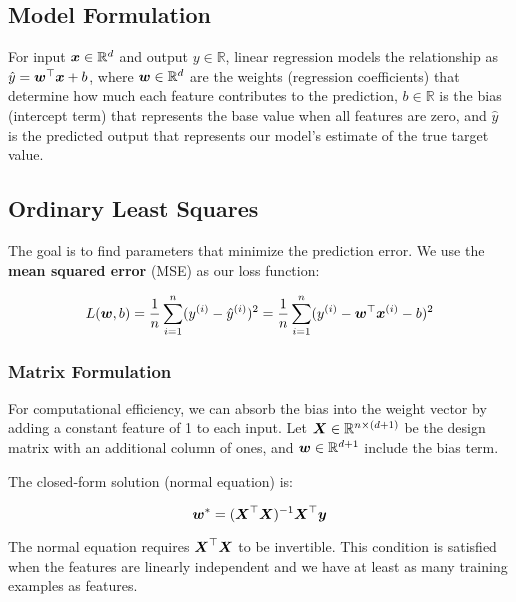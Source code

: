\subsection{Model Formulation}

For input $\boldsymbol{x} \in \mathbb{R}^d$ and output $y \in \mathbb{R}$, linear regression models the relationship as $\hat{y} = \boldsymbol{w}^\top \boldsymbol{x} + b$, where $\boldsymbol{w} \in \mathbb{R}^d$ are the weights (regression coefficients) that determine how much each feature contributes to the prediction, $b \in \mathbb{R}$ is the bias (intercept term) that represents the base value when all features are zero, and $\hat{y}$ is the predicted output that represents our model's estimate of the true target value.

\subsection{Ordinary Least Squares}

The goal is to find parameters that minimize the prediction error. We use the \textbf{mean squared error} (MSE) as our loss function:

\begin{equation}
L(\boldsymbol{w}, b) = \frac{1}{n} \sum_{i=1}^{n} (y^{(i)} - \hat{y}^{(i)})^2 = \frac{1}{n} \sum_{i=1}^{n} (y^{(i)} - \boldsymbol{w}^\top \boldsymbol{x}^{(i)} - b)^2
\end{equation}

\subsubsection{Matrix Formulation}

For computational efficiency, we can absorb the bias into the weight vector by adding a constant feature of 1 to each input. Let $\boldsymbol{X} \in \mathbb{R}^{n \times (d+1)}$ be the design matrix with an additional column of ones, and $\boldsymbol{w} \in \mathbb{R}^{d+1}$ include the bias term.

The closed-form solution (normal equation) is:

\begin{equation}
\boldsymbol{w}^* = (\boldsymbol{X}^\top \boldsymbol{X})^{-1} \boldsymbol{X}^\top \boldsymbol{y}
\end{equation}

\begin{remark}
The normal equation requires $\boldsymbol{X}^\top \boldsymbol{X}$ to be invertible. This condition is satisfied when the features are linearly independent and we have at least as many training examples as features.
\end{remark}


